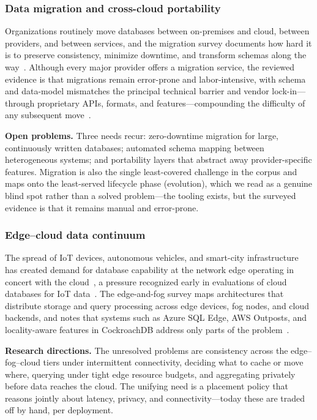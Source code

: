 \documentclass[a4paper,fleqn]{cas-sc}
\begin{document}
\subsubsection{Data migration and cross-cloud portability}
\label{subsubsec:migration}

Organizations routinely move databases between on-premises and cloud, between providers, and between services, and the migration survey documents how hard it is to preserve consistency, minimize downtime, and transform schemas along the way~\cite{Mathew2021CloudMigration}. Although every major provider offers a migration service, the reviewed evidence is that migrations remain error-prone and labor-intensive, with schema and data-model mismatches the principal technical barrier and vendor lock-in---through proprietary APIs, formats, and features---compounding the difficulty of any subsequent move~\cite{Opara2017LockIn}.

\textbf{Open problems.} Three needs recur: zero-downtime migration for large, continuously written databases; automated schema mapping between heterogeneous systems; and portability layers that abstract away provider-specific features. Migration is also the single least-covered challenge in the corpus and maps onto the least-served lifecycle phase (evolution), which we read as a genuine blind spot rather than a solved problem---the tooling exists, but the surveyed evidence is that it remains manual and error-prone.

\subsubsection{Edge--cloud data continuum}
\label{subsubsec:edgecloud}

The spread of IoT devices, autonomous vehicles, and smart-city infrastructure has created demand for database capability at the network edge operating in concert with the cloud~\cite{Gomes2024EdgeFog}, a pressure recognized early in evaluations of cloud databases for IoT data~\cite{Phan2014IoTCloudDB}. The edge-and-fog survey maps architectures that distribute storage and query processing across edge devices, fog nodes, and cloud backends, and notes that systems such as Azure SQL Edge, AWS Outposts, and locality-aware features in CockroachDB address only parts of the problem~\cite{Gomes2024EdgeFog}.

\textbf{Research directions.} The unresolved problems are consistency across the edge--fog--cloud tiers under intermittent connectivity, deciding what to cache or move where, querying under tight edge resource budgets, and aggregating privately before data reaches the cloud. The unifying need is a placement policy that reasons jointly about latency, privacy, and connectivity---today these are traded off by hand, per deployment.
\end{document}
